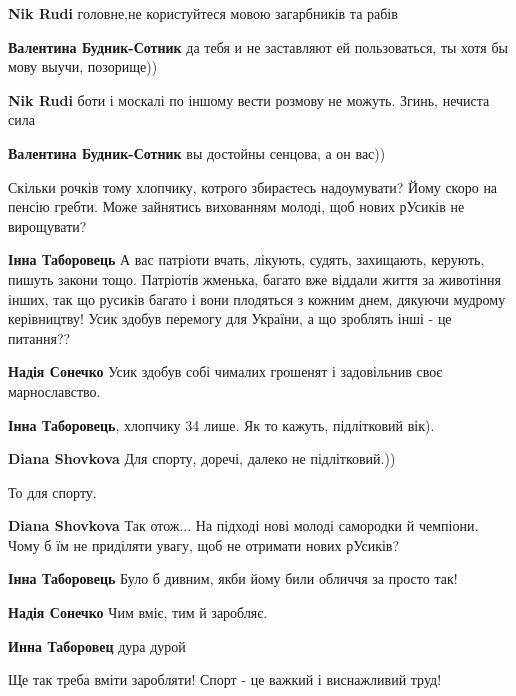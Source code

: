 \begin{itemize}
\begin{itemize}
\textbf{Nik Rudi} головне,не користуйтеся мовою загарбників та рабів

\textbf{Валентина Будник-Сотник} да тебя и не заставляют ей пользоваться, ты хотя бы мову выучи, позорище))

\textbf{Nik Rudi} боти і москалі по іншому вести розмову не можуть.
Згинь, нечиста сила

\textbf{Валентина Будник-Сотник} вы достойны сенцова, а он вас))

\end{itemize} %


Скільки рочків тому хлопчику, котрого збираєтесь надоумувати? Йому скоро на
пенсію гребти. Може зайнятись вихованням молоді, щоб нових рУсиків не
вирощувати?

\begin{itemize} %
\textbf{Інна Таборовець} А вас патріоти вчать, лікують, судять, захищають, керують, пишуть закони тощо. Патріотів жменька, багато вже віддали життя за животіння інших, так що русиків багато і вони плодяться з кожним днем, дякуючи мудрому керівництву! Усик здобув перемогу для України, а що зроблять інші - це питання??

\textbf{Надія Сонечко} Усик здобув собі чималих грошенят і задовільнив своє марнославство.

\textbf{Інна Таборовець}, хлопчику 34 лише. Як то кажуть, підлітковий вік).

\textbf{Diana Shovkova} Для спорту, доречі, далеко не підлітковий.))

То для спорту.

\textbf{Diana Shovkova} Так отож... На підході нові молоді самородки й чемпіони. Чому б їм не приділяти увагу, щоб не отримати нових рУсиків?

\textbf{Інна Таборовець} Було б дивним, якби йому били обличчя за просто так!

\textbf{Надія Сонечко} Чим вміє, тим й заробляє.

\textbf{Инна Таборовец} дура дурой

Ще так треба вміти заробляти! Спорт - це важкий і виснажливий труд!


\end{itemize}
\end{itemize}
